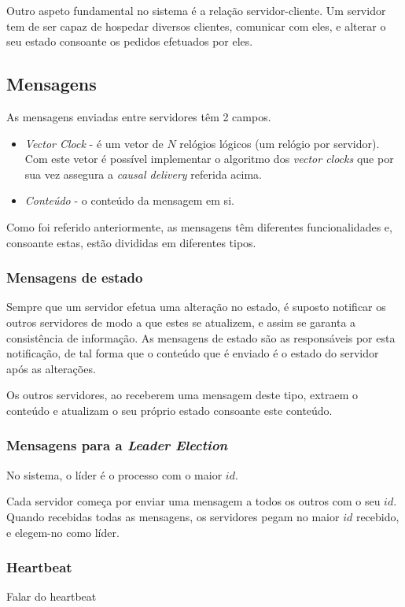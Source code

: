 \documentclass[12pt, a4paper]{report}
\begin{document}
Outro aspeto fundamental no sistema é a relação servidor-cliente. 
Um servidor tem de ser capaz de hospedar diversos clientes, comunicar com eles, e alterar o seu estado consoante os pedidos efetuados por eles.


\subsection{Mensagens}
As mensagens enviadas entre servidores têm 2 campos.
\begin{itemize}
    \item \textit{Vector Clock} - é um vetor de $N$ relógios lógicos (um relógio por servidor). Com este vetor é possível implementar o algoritmo dos \textit{vector clocks} que por sua vez assegura a \textit{causal delivery} referida acima.
    \item \textit{Conteúdo} - o conteúdo da mensagem em si.
\end{itemize}

Como foi referido anteriormente, as mensagens têm diferentes funcionalidades e, consoante estas, estão divididas em diferentes tipos.

\subsubsection{Mensagens de estado}
Sempre que um servidor efetua uma alteração no estado, é suposto notificar os outros servidores de modo a que estes se atualizem, e assim se garanta a consistência de informação.
As mensagens de estado são as responsáveis por esta notificação, de tal forma que o conteúdo que é enviado é o estado do servidor após as alterações.

Os outros servidores, ao receberem uma mensagem deste tipo, extraem o conteúdo e atualizam o seu próprio estado consoante este conteúdo.


\subsubsection{Mensagens para a \textit{Leader Election}}
No sistema, o líder é o processo com o maior $id$.

Cada servidor começa por enviar uma mensagem a todos os outros com o seu $id$.
Quando recebidas todas as mensagens, os servidores pegam no maior $id$ recebido, e elegem-no como líder.

\subsubsection{Heartbeat}
Falar do heartbeat
\end{document}
